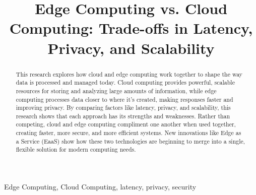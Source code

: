 \documentclass[conference]{IEEEtran}
\begin{document}
\title{Edge Computing vs. Cloud Computing: Trade-offs in Latency, Privacy, and Scalability 
}

\author{
\and

\and

\and

\and

}

\maketitle

\begin{abstract}
This research explores how cloud and edge computing work together to shape the way data is processed and managed today. Cloud computing provides powerful, scalable resources for storing and analyzing large amounts of information, while edge computing processes data closer to where it’s created, making responses faster and improving privacy. By comparing factors like latency, privacy, and scalability, this research shows that each approach has its strengths and weaknesses. Rather than competing, cloud and edge computing compliment one another when used together, creating faster, more secure, and more efficient systems. New innovations like Edge as a Service (EaaS) show how these two technologies are beginning to merge into a single, flexible solution for modern computing needs.
\end{abstract}

\begin{IEEEkeywords}
Edge Computing, Cloud Computing, latency, privacy, security
\end{IEEEkeywords}
\end{document}
